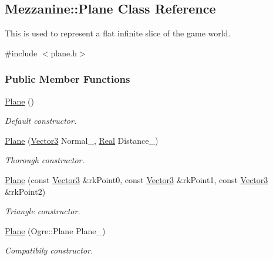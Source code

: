 \hypertarget{classMezzanine_1_1Plane}{
\subsection{Mezzanine::Plane Class Reference}
\label{classMezzanine_1_1Plane}
}


This is used to represent a flat infinite slice of the game world.  




{\ttfamily \#include $<$plane.h$>$}

\subsubsection*{Public Member Functions}
\begin{DoxyCompactItemize}
\item 
\hyperlink{classMezzanine_1_1Plane_a5d8a918982fe5424be3e9a11b1a849c2}{Plane} ()
\begin{DoxyCompactList}\small\item\em Default constructor. \item\end{DoxyCompactList}\item 
\hyperlink{classMezzanine_1_1Plane_a2d0bf4ad989b90b37cfb2eb386f144d2}{Plane} (\hyperlink{classMezzanine_1_1Vector3}{Vector3} Normal\_\-, \hyperlink{namespaceMezzanine_a726731b1a7df72bf3583e4a97282c6f6}{Real} Distance\_\-)
\begin{DoxyCompactList}\small\item\em Thorough constructor. \item\end{DoxyCompactList}\item 
\hyperlink{classMezzanine_1_1Plane_aabe30579ed531b3b0b2a7bd9ad412d3f}{Plane} (const \hyperlink{classMezzanine_1_1Vector3}{Vector3} \&rkPoint0, const \hyperlink{classMezzanine_1_1Vector3}{Vector3} \&rkPoint1, const \hyperlink{classMezzanine_1_1Vector3}{Vector3} \&rkPoint2)
\begin{DoxyCompactList}\small\item\em Triangle constructor. \item\end{DoxyCompactList}\item 
\hyperlink{classMezzanine_1_1Plane_a6f6efb7d12fa74b76945d90d2d7bad0e}{Plane} (Ogre::Plane Plane\_\-)
\begin{DoxyCompactList}\small\item\em Compatibily constructor. \item\end{DoxyCompactList}\item 

\end{DoxyCompactItemize}
